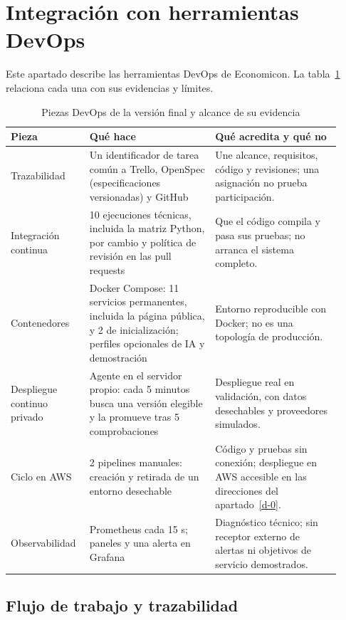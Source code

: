 \section{Integración con herramientas DevOps}\label{f-0}

Este apartado describe las herramientas DevOps de Economicon. La tabla~\ref{tab-f1} relaciona cada una con sus evidencias y límites. \cite{gobierno,despliegue,arquitectura,aws}

\begin{table}[!b]
\centering\footnotesize
\caption{Piezas DevOps de la versión final y alcance de su evidencia}\label{tab-f1}
\begin{tabular}{@{}p{0.2\linewidth}p{0.36\linewidth}p{0.36\linewidth}@{}}
\toprule
\textbf{Pieza} & \textbf{Qué hace} & \textbf{Qué acredita y qué no} \\
\midrule
Trazabilidad & Un identificador de tarea común a Trello, OpenSpec (especificaciones versionadas) y GitHub & Une alcance, requisitos, código y revisiones; una asignación no prueba participación. \\
Integración continua & 10 ejecuciones técnicas, incluida la matriz Python, por cambio y política de revisión en las pull requests & Que el código compila y pasa sus pruebas; no arranca el sistema completo. \\
Contenedores & Docker Compose: 11 servicios permanentes, incluida la página pública, y 2 de inicialización; perfiles opcionales de IA y demostración & Entorno reproducible con Docker; no es una topología de producción. \\
Despliegue continuo privado & Agente en el servidor propio: cada 5 minutos busca una versión elegible y la promueve tras 5 comprobaciones & Despliegue real en validación, con datos desechables y proveedores simulados. \\
Ciclo en AWS & 2 pipelines manuales: creación y retirada de un entorno desechable & Código y pruebas sin conexión; despliegue en AWS accesible en las direcciones del apartado~\ref{d-0}. \\
Observabilidad & Prometheus cada 15 s; paneles y una alerta en Grafana & Diagnóstico técnico; sin receptor externo de alertas ni objetivos de servicio demostrados. \\
\bottomrule
\end{tabular}
\end{table}

\subsection{Flujo de trabajo y trazabilidad}\label{f-1}

